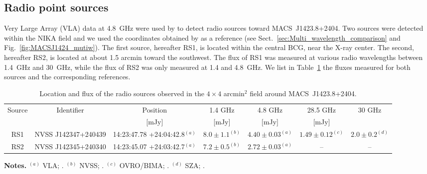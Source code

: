 \documentclass[traditabstract]{aa}
\begin{document}
\subsection{Radio point sources}
 Very Large Array (VLA) data  at 4.8~GHz were used by \cite{laroque2003} to detect radio sources toward \mbox{MACS~J1423.8+2404}. Two sources were detected within the NIKA field and we used the coordinates obtained by \cite{laroque2003} as a reference (see Sect.~\ref{sec:Multi_wavelength_comparison} and Fig.~\ref{fig:MACSJ1424_mutiw}). The first source, hereafter RS1, is located within the central BCG, near the X-ray center. The second, hereafter RS2, is located at about 1.5 arcmin toward the southwest. The flux of RS1 was measured at various radio wavelengths between 1.4~GHz and 30~GHz, while the flux of RS2 was only measured at 1.4 and 4.8~GHz. We list in Table~\ref{tab:Radio_ps} the fluxes measured for both sources and the corresponding references. 
\begin{table}[h]
\caption{{\footnotesize Location and flux of the radio sources observed in the $4 \times 4$ arcmin$^2$ field around \mbox{MACS~J1423.8+2404}.}}
\begin{center}
\begin{tabular}{ccccccc}
\hline
\hline
Source & Identifier & Position & 1.4 GHz & 4.8 GHz & 28.5 GHz & 30 GHz \\
 &  & [mJy] & [mJy] & [mJy] & [mJy] \\
\hline
RS1 & NVSS J142347+240439 & 14:23:47.78 +24:04:42.8$^{(a)}$ & $8.0 \pm 1.1 ^{(b)}$ & $4.40 \pm 0.03 ^{(a)}$ & $1.49 \pm 0.12 ^{(c)}$ & $2.0 \pm 0.2 ^{(d)}$ \\
RS2 & NVSS J142345+240340 & 14:23:45.07 +24:03:42.7$^{(a)}$ & $7.2 \pm 0.5 ^{(b)}$ & $2.72 \pm 0.03 ^{(a)}$ &  -- & --  \\  
\hline
\end{tabular}
\end{center}
{\small {\bf Notes.} $^{(a)}$ VLA; \cite{laroque2003}. $^{(b)}$ NVSS; \cite{condon1998}. $^{(c)}$ OVRO/BIMA; \cite{coble2007}. $^{(d)}$ SZA; \cite{bonamente2012}.}
\label{tab:Radio_ps}
\end{table}
\end{document}
